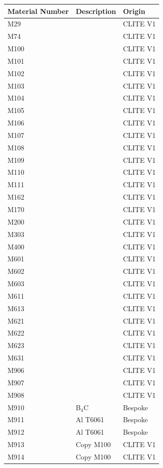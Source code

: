 \documentclass[12pt]{article}
\begin{document}
\begin{centering}
 \begin{longtable}[ht!]{ p{} | p{} | p{} }
  \hline 
  Material Number & Description & Origin \\
  \hline
  M29  & &  CLITE V1 \\
  M74  & &  CLITE V1 \\
  M100  & &  CLITE V1 \\
  M101  & &  CLITE V1 \\
  M102  & &  CLITE V1 \\
  M103  & &  CLITE V1 \\
  M104  & &  CLITE V1 \\
  M105  & &  CLITE V1 \\
  M106  & &  CLITE V1 \\
  M107  & &  CLITE V1 \\
  M108  & &  CLITE V1 \\
  M109  & &  CLITE V1 \\
  M110  & &  CLITE V1 \\
  M111  & &  CLITE V1 \\
  M162  & &  CLITE V1 \\
  M170  & &  CLITE V1 \\
  M200  & &  CLITE V1 \\
  M303  & &  CLITE V1 \\
  M400  & &  CLITE V1 \\
  M601  & &  CLITE V1 \\
  M602  & &  CLITE V1 \\
  M603  & &  CLITE V1 \\
  M611  & &  CLITE V1 \\
  M613  & &  CLITE V1 \\
  M621  & &  CLITE V1 \\
  M622  & &  CLITE V1 \\
  M623  & &  CLITE V1 \\
  M631  & &  CLITE V1 \\
  M906  & &  CLITE V1 \\
  M907  & &  CLITE V1 \\
  M908  & &  CLITE V1 \\
  M910 & B$_4$C & Bespoke  \\
  M911 & Al T6061 & Bespoke  \\
  M912 & Al T6061 & Bespoke  \\
  M913 & Copy M100 & CLITE V1\\
  M914 & Copy M100 & CLITE V1\\

\end{longtable}
\end{centering}
\end{document}
